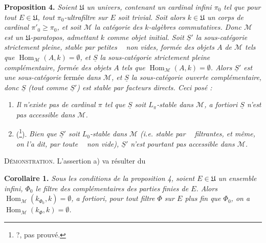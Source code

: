 \documentclass[11pt]{article}
\newcommand{\printedpage}[1]{\marginpar{\footnotesize p.~#1}}
\newcommand{\msp}[1]{\marginpar{\footnotesize [#1]}}
\newcommand{\limind}{\mathop{\underrightarrow{\mathrm{lim}}}}
\begin{document}
\textbf{Proposition 4.} \textit{Soient $\mathfrak{U}$ un univers, contenant un cardinal infini $\pi_0$ tel que pour tout $E\in\mathfrak{U}$, tout $\pi_0$-ultrafiltre sur $E$ soit trivial. Soit alors $k\in\mathfrak{U}$ un corps de cardinal $\pi'_0\geqslant\pi_0$, et soit $\mathcal{M}$ la catégorie}
\printedpage{197}
\msp{page 14}
\textit{des $k$-algèbres commutatives. Donc $\mathcal{M}$ est un $\mathfrak{U}$-paratopos, admettant $k$ comme objet initial. Soit $\underline{S}'$ la sous-catégorie strictement pleine, stable par petites $\limind$ non vides, formée des objets $A$ de $\mathcal{M}$ tels que $\operatorname{Hom}_{\mathcal{M}}(A,k)=\emptyset$, et $\underline{S}$ la sous-catégorie strictement pleine complémentaire, formée des objets $A$ tels que $\operatorname{Hom}_{\mathcal{M}}(A,k)=\emptyset$. Alors $\underline{S}'$ est une sous-catégorie} fermée \textit{dans $\mathcal{M}$, et $\underline{S}$ la sous-catégorie ouverte complémentaire, donc $\underline{S}$ (tout comme $\underline{S}'$) est stable par facteurs directs. Ceci posé :} %
\begin{enumerate}[label={}]
\item[\textit{a)}] \textit{Il n'existe pas de cardinal $\pi$ tel que $\underline{S}$ soit $L_\pi$-stable dans $\mathcal{M}$, a fortiori $\underline{S}$ n'est pas accessible dans $\mathcal{M}$.}
\item[\textit{b)}] (\footnote[207]{?, pas prouvé.}). \textit{Bien que $\underline{S}'$ soit $L_0$-stable dans $\mathcal{M}$ (i.e. stable par $\limind$ filtrantes, et même, on l'a dit, par toute $\limind$ non vide), $\underline{S}'$ n'est pourtant pas accessible dans $\mathcal{M}$.}
\end{enumerate}
\noindent\textsc{Démonstration}. L'assertion a) va résulter du

\textbf{Corollaire 1.} \textit{Sous les conditions de la proposition 4, soient $E\in\mathfrak{U}$ un ensemble infini, $\Phi_0$ le filtre des complémentaires des parties finies de $E$. Alors $\operatorname{Hom}_{\mathcal{M}}(k_{\Phi_0},k)=\emptyset$, a fortiori, pour tout filtre $\Phi$ sur $E$ plus fin que $\Phi_0$, on a $\operatorname{Hom}_{\mathcal{M}}(k_\Phi,k)=\emptyset$.}
\end{document}
